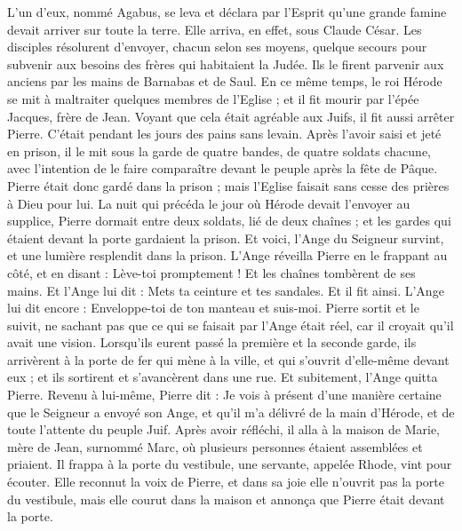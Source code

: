 \begin{multicols}{2}
L'un d'eux, nommé Agabus, se leva et déclara par l'Esprit qu'une grande famine devait arriver sur toute la terre. Elle arriva, en effet, sous Claude César.
Les disciples résolurent d'envoyer, chacun selon ses moyens, quelque secours pour subvenir aux besoins des frères qui habitaient la Judée.
Ils le firent parvenir aux anciens par les mains de Barnabas et de Saul.
\VerseOne{}En ce même temps, le roi Hérode se mit à maltraiter quelques membres de l'Eglise ;
et il fit mourir par l'épée Jacques, frère de Jean.
Voyant que cela était agréable aux Juifs, il fit aussi arrêter Pierre. C'était pendant les jours des pains sans levain.
Après l'avoir saisi et jeté en prison, il le mit sous la garde de quatre bandes, de quatre soldats chacune, avec l'intention de le faire comparaître devant le peuple après la fête de Pâque.
Pierre était donc gardé dans la prison ; mais l'Eglise faisait sans cesse des prières à Dieu pour lui.
La nuit qui précéda le jour où Hérode devait l'envoyer au supplice, Pierre dormait entre deux soldats, lié de deux chaînes ; et les gardes qui étaient devant la porte gardaient la prison.
Et voici, l'Ange du Seigneur survint, et une lumière resplendit dans la prison. L'Ange réveilla Pierre en le frappant au côté, et en disant : Lève-toi promptement ! Et les chaînes tombèrent de ses mains.
Et l'Ange lui dit : Mets ta ceinture et tes sandales. Et il fit ainsi. L'Ange lui dit encore : Enveloppe-toi de ton manteau et suis-moi.
Pierre sortit et le suivit, ne sachant pas que ce qui se faisait par l'Ange était réel, car il croyait qu'il avait une vision.
Lorsqu'ils eurent passé la première et la seconde garde, ils arrivèrent à la porte de fer qui mène à la ville, et qui s'ouvrit d'elle-même devant eux ; et ils sortirent et s'avancèrent dans une rue. Et subitement, l'Ange quitta Pierre.
Revenu à lui-même, Pierre dit : Je vois à présent d'une manière certaine que le Seigneur a envoyé son Ange, et qu'il m'a délivré de la main d'Hérode, et de toute l'attente du peuple Juif.
Après avoir réfléchi, il alla à la maison de Marie, mère de Jean, surnommé Marc, où plusieurs personnes étaient assemblées et priaient.
Il frappa à la porte du vestibule, une servante, appelée Rhode, vint pour écouter.
Elle reconnut la voix de Pierre, et dans sa joie elle n'ouvrit pas la porte du vestibule, mais elle courut dans la maison et annonça que Pierre était devant la porte.

\end{multicols}
